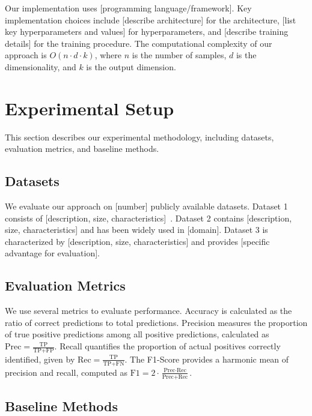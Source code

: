 \documentclass[12pt,a4paper]{article}
\theoremstyle{definition}
\theoremstyle{remark}
\begin{document}
Our implementation uses [programming language/framework]. Key implementation choices include [describe architecture] for the architecture, [list key hyperparameters and values] for hyperparameters, and [describe training details] for the training procedure. The computational complexity of our approach is $O(n \cdot d \cdot k)$, where $n$ is the number of samples, $d$ is the dimensionality, and $k$ is the output dimension.

\section{Experimental Setup}
\label{sec:experimental}

This section describes our experimental methodology, including datasets, evaluation metrics, and baseline methods.

\subsection{Datasets}
\label{subsec:datasets}

We evaluate our approach on [number] publicly available datasets. Dataset 1 consists of [description, size, characteristics]~\cite{dataset1}. Dataset 2 contains [description, size, characteristics] and has been widely used in [domain]. Dataset 3 is characterized by [description, size, characteristics] and provides [specific advantage for evaluation].

\subsection{Evaluation Metrics}
\label{subsec:metrics}

We use several metrics to evaluate performance. Accuracy is calculated as the ratio of correct predictions to total predictions. Precision measures the proportion of true positive predictions among all positive predictions, calculated as $\text{Prec} = \frac{\text{TP}}{\text{TP} + \text{FP}}$. Recall quantifies the proportion of actual positives correctly identified, given by $\text{Rec} = \frac{\text{TP}}{\text{TP} + \text{FN}}$. The F1-Score provides a harmonic mean of precision and recall, computed as $\text{F1} = 2 \cdot \frac{\text{Prec} \cdot \text{Rec}}{\text{Prec} + \text{Rec}}$.

\subsection{Baseline Methods}
\label{subsec:baselines}
\end{document}
